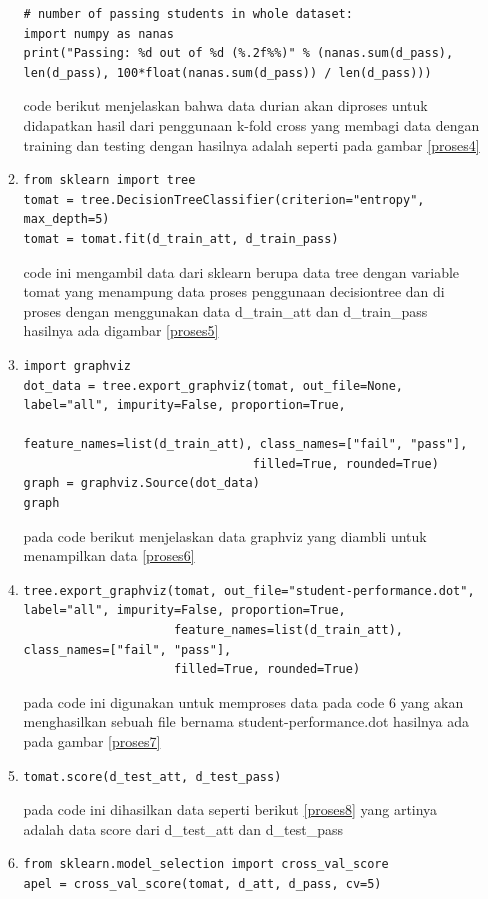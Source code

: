 \begin{itemize}
\begin{enumerate}
\begin{verbatim}
# number of passing students in whole dataset:
import numpy as nanas
print("Passing: %d out of %d (%.2f%%)" % (nanas.sum(d_pass), len(d_pass), 100*float(nanas.sum(d_pass)) / len(d_pass)))

\end{verbatim}
\subitem
code berikut menjelaskan bahwa data durian akan diproses untuk didapatkan hasil dari penggunaan k-fold cross yang membagi data dengan training dan testing dengan hasilnya adalah seperti pada gambar \ref{proses4}
\item 
\begin{verbatim}
from sklearn import tree
tomat = tree.DecisionTreeClassifier(criterion="entropy", max_depth=5)
tomat = tomat.fit(d_train_att, d_train_pass)

\end{verbatim}
\subitem
code ini mengambil data dari sklearn berupa data tree dengan variable tomat yang menampung data proses penggunaan decisiontree dan di proses dengan menggunakan data d\_train\_att dan d\_train\_pass hasilnya ada digambar \ref{proses5}
\item
\begin{verbatim}
import graphviz
dot_data = tree.export_graphviz(tomat, out_file=None, label="all", impurity=False, proportion=True,
                                feature_names=list(d_train_att), class_names=["fail", "pass"], 
                                filled=True, rounded=True)
graph = graphviz.Source(dot_data)
graph
\end{verbatim}
\subitem
pada code berikut menjelaskan data graphviz yang diambli untuk menampilkan data \ref{proses6}
\item 
\begin{verbatim}
tree.export_graphviz(tomat, out_file="student-performance.dot", label="all", impurity=False, proportion=True,
                     feature_names=list(d_train_att), class_names=["fail", "pass"], 
                     filled=True, rounded=True)
\end{verbatim}
\subitem
pada code ini digunakan untuk memproses data pada code 6 yang akan menghasilkan sebuah file bernama student-performance.dot hasilnya ada pada gambar \ref{proses7}
\item 
\begin{verbatim}
tomat.score(d_test_att, d_test_pass)

\end{verbatim}
\subitem
pada code ini dihasilkan data seperti berikut \ref{proses8} yang artinya adalah data score dari d\_test\_att dan d\_test\_pass 
\item 
\begin{verbatim}
from sklearn.model_selection import cross_val_score
apel = cross_val_score(tomat, d_att, d_pass, cv=5)


\end{verbatim}
\end{enumerate}
\end{itemize}
